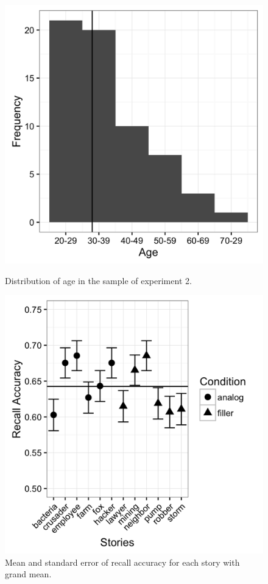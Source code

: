 \documentclass[a4paper,man,natbib,floatsintext,import]{apa6}
\begin{document}
\begin{figure}
\begin{minipage}[t]{.5\textwidth}
\includegraphics[width=.9\linewidth]{figures/sample2_age.png}
\caption{Distribution of age in the sample of experiment 2.}
\label{fig:sample2_age}
\end{minipage}
\begin{minipage}[t]{.5\textwidth}
\includegraphics[width=.9\linewidth]{figures/material2_stories.png}
\caption{Mean and standard error of recall accuracy for each story with grand mean.}
\label{fig:material2_stories}
\end{minipage}
\end{figure}
\end{document}
